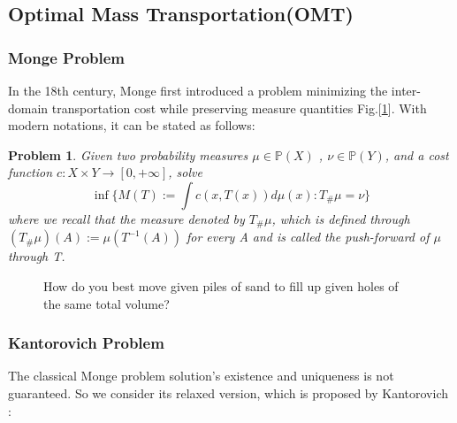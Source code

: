\documentclass[runningheads]{llncs}
\newtheorem{mypro}{Problem}
\begin{document}
\subsection{Optimal Mass Transportation(OMT)}
\subsubsection{Monge Problem}

In the 18th century, Monge first introduced a problem minimizing the inter-domain transportation cost while preserving measure quantities Fig.[\ref{fig:piles}]. With modern notations, it can be stated as follows:
\begin{mypro}
Given two probability measures $\mu \in \mathbb{P}(X)$ , $\nu \in \mathbb{P}(Y) $, and a cost function $c : X \times Y \rightarrow [0,+\infty]$, solve $$\inf \{M(T) := \int c(x,T(x))d\mu(x): T_{\#}\mu=\nu\}$$
where we recall that the measure denoted by $T_{\#}\mu$, which is defined through $(T_{\#}\mu)(A):=\mu(T^{-1}(A))$ for every A and is called the push-forward of $\mu$ through T.
\end{mypro}

\begin{figure}
\centering
{}
\caption{How do you best move given piles of sand to fill up given holes of the same total volume?}
\label{fig:piles}
\end{figure}


\subsubsection{Kantorovich Problem}

The classical Monge problem solution's existence and uniqueness is not guaranteed. So we consider its relaxed version, which is proposed by Kantorovich \cite{kantorovich1942transfer} :
\end{document}
